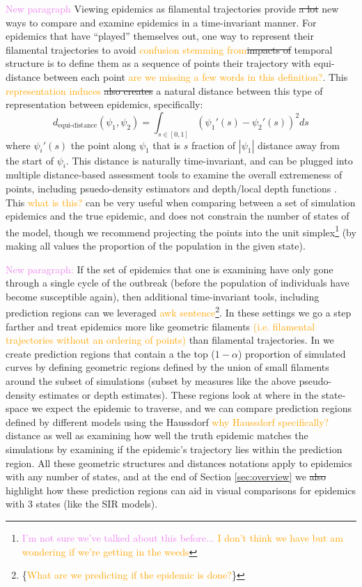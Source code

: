 \documentclass[
  shortnames]{jss}
\begin{document}
\textcolor{violet}{New paragraph} Viewing epidemics as filamental
trajectories provide \sout{a lot }new ways to compare and examine
epidemics in a time-invariant manner. For epidemics that have ``played''
themselves out, one way to represent their filamental trajectories to
avoid \textcolor{orange}{confusion stemming from}\sout{impacts of}
temporal structure is to define them as a sequence of points their
trajectory with equi-distance between each point
\textcolor{orange}{are we missing a few words in this definition?}. This
\textcolor{orange}{representation induces}\sout{ also creates} a natural
distance between this type of representation between epidemics,
specifically: \[
d_\text{equi-distance}(\psi_1, \psi_2)  = \int_{s \in [0,1]} (\psi_1'(s) - \psi_2'(s))^2 ds
\] where \(\psi_i'(s)\) the point along \(\psi_1\) that is \(s\)
fraction of \(|\psi_1|\) distance away from the start of \(\psi_i\).
This distance is naturally time-invariant, and can be plugged into
multiple distance-based assessment tools to examine the overall
extremeness of points, including psuedo-density estimators and
depth/local depth functions
\citep[for examples see][]{Ciollaro2016, Geenens2017}. This
\textcolor{orange}{what is this?} can be very useful when comparing
between a set of simulation epidemics and the true epidemic, and does
not constrain the number of states of the model, though we recommend
projecting the points into the unit
simplex\footnote{\textcolor{violet}{I'm not sure we've talked about this before... \textcolor{orange}{I don't think we have but am wondering if we're getting in the weeds}}}
(by making all values the proportion of the population in the given
state).

\textcolor{violet}{New paragraph:} If the set of epidemics that one is
examining have only gone through a single cycle of the outbreak (before
the population of individuals have become susceptible again), then
additional time-invariant tools, including prediction regions can we
leveraged \textcolor{orange}{awk sentence}\footnote{\{\textcolor{orange}{What are we predicting if the epidemic is done?}\}}.
In these settings we go a step farther and treat epidemics more like
geometric filaments
\textcolor{orange}{(i.e. filamental trajectories without an ordering of points)}
than filamental trajectories. In  we create prediction
regions that contain a the top (\(1-\alpha\)) proportion of simulated
curves by defining geometric regions defined by the union of small
filaments around the subset of simulations (subset by measures like the
above pseudo-density estimates or depth estimates). These regions look
at where in the state-space we expect the epidemic to traverse, and we
can compare prediction regions defined by different models using the
Haussdorf \textcolor{orange}{why Haussdorf specifically?} distance as
well as examining how well the truth epidemic matches the simulations by
examining if the epidemic's trajectory lies within the prediction
region. All these geometric structures and distances notations apply to
epidemics with any number of states, and at the end of Section
\ref{sec:overview} we \sout{also} highlight how these prediction regions
can aid in visual comparisons for epidemics with 3 states (like the SIR
models).
\end{document}
